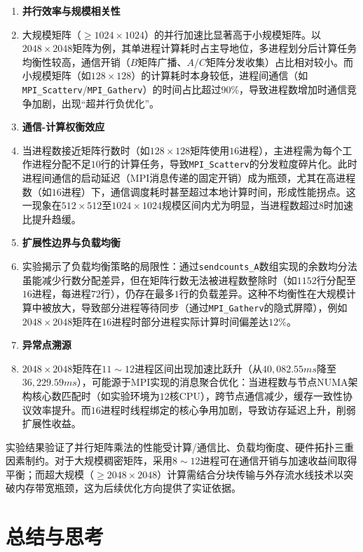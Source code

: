 \documentclass[a4paper, utf8]{ctexart}
\begin{document}
	\begin{enumerate}[itemsep=2pt, topsep=0pt, parsep=0pt]
		\item \textbf{并行效率与规模相关性}
		\item[] 大规模矩阵（$\geq1024\times1024$）的并行加速比显著高于小规模矩阵。以$2048\times2048$矩阵为例，其单进程计算耗时占主导地位，多进程划分后计算任务均衡性较高，通信开销（$B$矩阵广播、$A$/$C$矩阵分发收集）占比相对较小。而小规模矩阵（如$128\times128$）的计算耗时本身较低，进程间通信（如\verb|MPI_Scatterv|/\verb|MPI_Gatherv|）的时间占比超过90\%，导致进程数增加时通信竞争加剧，出现“超并行负优化”。
		\item \textbf{通信-计算权衡效应}
		\item[] 当进程数接近矩阵行数时（如$128\times128$矩阵使用$16$进程），主进程需为每个工作进程分配不足$10$行的计算任务，导致\verb|MPI_Scatterv|的分发粒度碎片化。此时进程间通信的启动延迟（MPI消息传递的固定开销）成为瓶颈，尤其在高进程数（如$16$进程）下，通信调度耗时甚至超过本地计算时间，形成性能拐点。这一现象在$512\times512$至$1024\times1024$规模区间内尤为明显，当进程数超过$8$时加速比提升趋缓。
		\item \textbf{扩展性边界与负载均衡}
		\item[] 实验揭示了负载均衡策略的局限性：通过\verb|sendcounts_A|数组实现的余数均分法虽能减少行数分配差异，但在矩阵行数无法被进程数整除时（如$1152$行分配至$16$进程，每进程$72$行），仍存在最多$1$行的负载差异。这种不均衡性在大规模计算中被放大，导致部分进程等待同步（通过\verb|MPI_Gatherv|的隐式屏障），例如$2048\times2048$矩阵在$16$进程时部分进程实际计算时间偏差达$12\%$。
		\item \textbf{异常点溯源}
		\item[] $2048\times2048$矩阵在$11\sim12$进程区间出现加速比跃升（从$40,082.55ms$降至$36,229.59ms$），可能源于MPI实现的消息聚合优化：当进程数与节点NUMA架构核心数匹配时（如实验环境为$12$核CPU），跨节点通信减少，缓存一致性协议效率提升。而$16$进程时线程绑定的核心争用加剧，导致访存延迟上升，削弱扩展性收益。
	\end{enumerate}
	
	\vspace{.5em}
	
	实验结果验证了并行矩阵乘法的性能受计算/通信比、负载均衡度、硬件拓扑三重因素制约。对于大规模稠密矩阵，采用$8\sim12$进程可在通信开销与加速收益间取得平衡；而超大规模（$\geq2048\times2048$）计算需结合分块传输与外存流水线技术以突破内存带宽瓶颈，这为后续优化方向提供了实证依据。
	
	\section{总结与思考}
	
\end{document}
